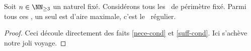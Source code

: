

\begin{fact}
    Soit $n \in \NN_{\geq3}$ un naturel fixé.
    Considérons tous les \ngones\  de périmètre fixé. Parmi tous ces \ngones, un seul est d'aire maximale, c'est le \ngone\ régulier.
\end{fact}


\begin{proof}
    Ceci découle directement des faits \ref{nece-cond} et \ref{suff-cond}.
    Ici s'achève notre joli voyage.
\end{proof}
